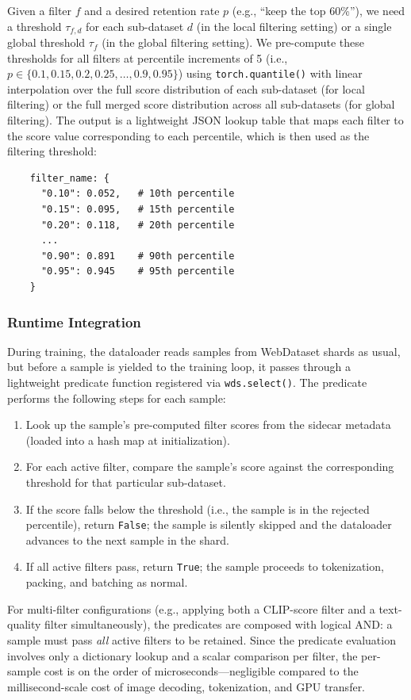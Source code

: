 Given a filter $f$ and a desired retention rate $p$ (e.g., ``keep the top 60\%''), we need a threshold $\tau_{f,d}$ for each sub-dataset $d$ (in the local filtering setting) or a single global threshold $\tau_f$ (in the global filtering setting).
We pre-compute these thresholds for all filters at percentile increments of 5 (i.e., $p \in \{0.1, 0.15, 0.2, 0.25, \ldots, 0.9, 0.95\}$) using \texttt{torch.quantile()} with linear interpolation over the full score distribution of each sub-dataset (for local filtering) or the full merged score distribution across all sub-datasets (for global filtering).
The output is a lightweight JSON lookup table that maps each filter to the score value corresponding to each percentile, which is then used as the filtering threshold:
\begin{verbatim}
    filter_name: {
      "0.10": 0.052,   # 10th percentile
      "0.15": 0.095,   # 15th percentile
      "0.20": 0.118,   # 20th percentile
      ...
      "0.90": 0.891    # 90th percentile
      "0.95": 0.945    # 95th percentile
    }
\end{verbatim}

\subsubsection{Runtime Integration}

During training, the dataloader reads samples from WebDataset shards as usual, but before a sample is yielded to the training loop, it passes through a lightweight predicate function registered via \texttt{wds.select()}.
The predicate performs the following steps for each sample:
\begin{enumerate}[leftmargin=*, itemsep=2pt]
    \item Look up the sample's pre-computed filter scores from the sidecar metadata (loaded into a hash map at initialization).
    \item For each active filter, compare the sample's score against the corresponding threshold for that particular sub-dataset.
    \item If the score falls below the threshold (i.e., the sample is in the rejected percentile), return \texttt{False}; the sample is silently skipped and the dataloader advances to the next sample in the shard.
    \item If all active filters pass, return \texttt{True}; the sample proceeds to tokenization, packing, and batching as normal.
\end{enumerate}
For multi-filter configurations (e.g., applying both a CLIP-score filter and a text-quality filter simultaneously), the predicates are composed with logical AND: a sample must pass \emph{all} active filters to be retained.
Since the predicate evaluation involves only a dictionary lookup and a scalar comparison per filter, the per-sample cost is on the order of microseconds---negligible compared to the millisecond-scale cost of image decoding, tokenization, and GPU transfer.


